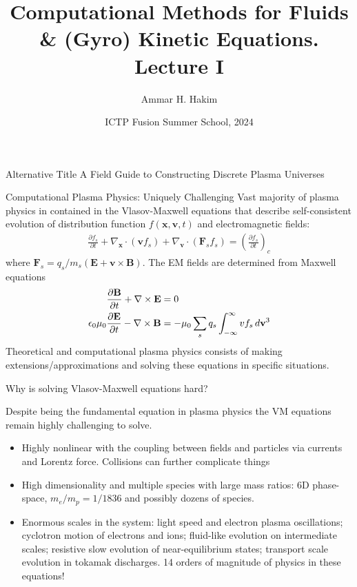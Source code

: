 \documentclass[aspectratio=43]{beamer}
\title[{\tt }] {Computational Methods for Fluids \& (Gyro) Kinetic
  Equations. Lecture I}%
\author[http://cmpp.rtfd.io]%
{Ammar H. Hakim\inst{1}}%
\institute[PPPL]
{ \inst{1} Princeton Plasma Physics Laboratory, Princeton, NJ %
}
\date[5/9/2024]{ICTP Fusion Summer School, 2024}
\newcommand{\pfrac}[2]{\frac{\partial #1}{\partial #2}}
\newcommand{\gcs}{\nabla_{\mvec{x}}}
\newcommand{\gvs}{\nabla_{\mvec{v}}}
\newcommand{\mvec}[1]{\mathbf{#1}}
\newcommand{\mypause}{\pause}
\begin{document}
\begin{frame}
  \titlepage
\end{frame}

\begin{frame}

  \begin{block}{Alternative Title}
    A Field Guide to Constructing Discrete Plasma Universes
  \end{block}  

\end{frame}

\begin{frame}{Computational Plasma Physics: Uniquely Challenging}
  \footnotesize Vast majority of plasma physics in contained in the
  Vlasov-Maxwell equations that describe self-consistent evolution of
  distribution function $f(\mvec{x},\mvec{v},t)$ and electromagnetic
  fields:
  \begin{align*}
    \pfrac{f_s}{t} + \gcs\cdot (\mvec{v} f_s) + \gvs\cdot (\mvec{F}_s
    f_s) = \left( \pfrac{f_s}{t} \right)_c
  \end{align*}
  where $\mvec{F}_s=q_s/m_s (\mvec{E}+\mvec{v}\times\mvec{B})$. The EM
  fields are determined from Maxwell equations
  \begin{align*}
    \frac{\partial \mvec{B}}{\partial t} + \nabla\times\mvec{E} &= 0 \\
    \epsilon_0\mu_0\frac{\partial \mvec{E}}{\partial t} -
    \nabla\times\mvec{B} &= -\mu_0\sum_s q_s \int_{-\infty}^\infty v f_s \thinspace d\mvec{v}^3
  \end{align*}
  Theoretical and computational plasma physics consists of making
  extensions/approximations and solving these equations in specific
  situations.
\end{frame}

\begin{frame}{Why is solving Vlasov-Maxwell equations hard?}
  
  Despite being the fundamental equation in plasma physics the VM
  equations remain highly challenging to solve.
  \begin{itemize}
  \item Highly nonlinear with the coupling between fields and
    particles via currents and Lorentz force. Collisions can further
    complicate things
    \mypause%
  \item High dimensionality and multiple species with large mass
    ratios: 6D phase-space, $m_e/m_p = 1/1836$ and possibly dozens of
    species.
    \mypause%
  \item Enormous scales in the system: light speed and electron plasma
    oscillations; cyclotron motion of electrons and ions; fluid-like
    evolution on intermediate scales; resistive slow evolution of
    near-equilibrium states; transport scale evolution in tokamak
    discharges.  14 orders of magnitude of physics in these
    equations!
  \end{itemize}
\end{frame}
\end{document}
